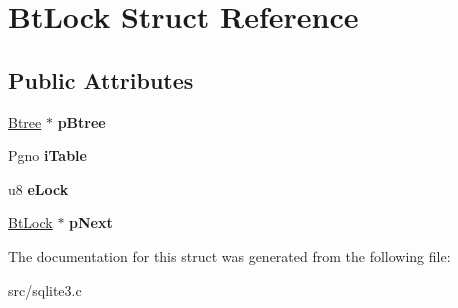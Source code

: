 \hypertarget{struct_bt_lock}{\section{Bt\-Lock Struct Reference}
\label{struct_bt_lock}
}
\subsection*{Public Attributes}
\begin{DoxyCompactItemize}
\item 
\hypertarget{struct_bt_lock_ab9125b8e79d480b75f3af21cb2ab55c7}{\hyperlink{struct_btree}{Btree} $\ast$ {\bfseries p\-Btree}}\label{struct_bt_lock_ab9125b8e79d480b75f3af21cb2ab55c7}

\item 
\hypertarget{struct_bt_lock_a822efcf018d6c8eb343341cde5df980d}{Pgno {\bfseries i\-Table}}\label{struct_bt_lock_a822efcf018d6c8eb343341cde5df980d}

\item 
\hypertarget{struct_bt_lock_abe07b71018ee423e0d94b5cdba044b5c}{u8 {\bfseries e\-Lock}}\label{struct_bt_lock_abe07b71018ee423e0d94b5cdba044b5c}

\item 
\hypertarget{struct_bt_lock_ad42de86209c7aab43604c52a549b7bca}{\hyperlink{struct_bt_lock}{Bt\-Lock} $\ast$ {\bfseries p\-Next}}\label{struct_bt_lock_ad42de86209c7aab43604c52a549b7bca}

\end{DoxyCompactItemize}


The documentation for this struct was generated from the following file\-:\begin{DoxyCompactItemize}
\item 
src/sqlite3.\-c\end{DoxyCompactItemize}

